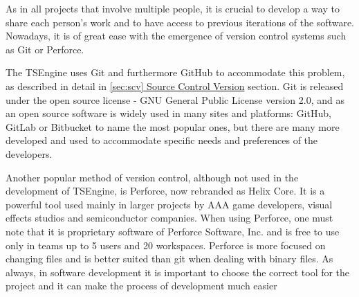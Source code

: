 As in all projects that involve multiple people, it is crucial to develop a way to share each person's work and to have access to previous iterations of the software. Nowadays, it is of great ease with the emergence of version control systems such as Git or Perforce. 

The TSEngine uses Git and furthermore GitHub to accommodate this problem, as described in detail in \hyperref[sec:scv]{\ref*{sec:scv} Source Control Version} section. Git is released under the open source license -  GNU General Public License version 2.0, and as an open source software is widely used in many sites and platforms: GitHub, GitLab or Bitbucket to name the most popular ones, but there are many more developed and used to accommodate specific needs and preferences of the developers.

Another popular method of version control, although not used in the development of TSEngine, is Perforce, now rebranded as Helix Core. It is a powerful tool used mainly in larger projects by AAA game developers, visual effects studios and semiconductor companies. When using Perforce, one must note that it is proprietary software of Perforce Software, Inc. and is free to use only in teams up to 5 users and 20 workspaces. Perforce is more focused on changing files and is better suited than git when dealing with binary files. As always, in software development it is important to choose the correct tool for the project and it can make the process of development much easier



